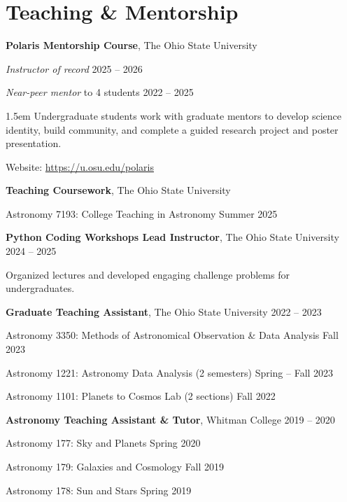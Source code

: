 \section*{Teaching \& Mentorship}

{\bf Polaris Mentorship Course}, The Ohio State University


{\it Instructor of record} \hfill 2025 -- 2026

{\it Near-peer mentor} to 4 students \hfill 2022 -- 2025

\vspace{-2pt}
\begin{adjustwidth}{1.5em}{}
Undergraduate students work with graduate mentors to develop science identity, build community, and complete a guided research project and poster presentation. 
\end{adjustwidth}

\vspace{-2pt}
Website: \url{https://u.osu.edu/polaris}


\vspace{12pt}
\noindent
{\bf Teaching Coursework}, The Ohio State University

Astronomy 7193: College Teaching in Astronomy
\hfill Summer 2025

\vspace{12pt}
\noindent
{\bf Python Coding Workshops Lead Instructor}, The Ohio State University
\hfill 2024 -- 2025

Organized lectures and developed engaging challenge problems for undergraduates.

\vspace{12pt}
\noindent
\textbf{Graduate Teaching Assistant}, The Ohio State University
\hfill 2022 -- 2023

Astronomy 3350: Methods of Astronomical Observation \& Data Analysis
\hfill Fall 2023

Astronomy 1221: Astronomy Data Analysis (2 semesters)
\hfill Spring -- Fall 2023

Astronomy 1101: Planets to Cosmos Lab (2 sections)
\hfill Fall 2022

\vspace{12pt}
\noindent
\textbf{Astronomy Teaching Assistant \& Tutor}, Whitman College 
\hfill 2019 -- 2020

Astronomy 177: Sky and Planets
\hfill Spring 2020

Astronomy 179: Galaxies and Cosmology
\hfill Fall 2019

Astronomy 178: Sun and Stars
\hfill Spring 2019\\
\vspace{-12pt}
